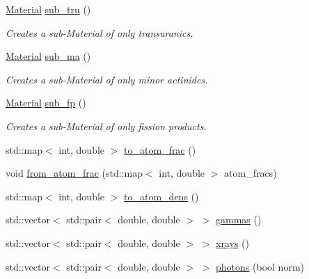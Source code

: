 \begin{DoxyCompactItemize}
\mbox{\label{classpyne_1_1_material_ab0d02f754f1570cca42b33258d1db997}} 
\hyperlink{classpyne_1_1_material}{Material} \hyperlink{classpyne_1_1_material_ab0d02f754f1570cca42b33258d1db997}{sub\+\_\+tru} ()
\begin{DoxyCompactList}\small\item\em Creates a sub-\/\+Material of only transuranics. \end{DoxyCompactList}\item 
\mbox{\label{classpyne_1_1_material_a9d0e3214dda2be1f96a61cf8e379c086}} 
\hyperlink{classpyne_1_1_material}{Material} \hyperlink{classpyne_1_1_material_a9d0e3214dda2be1f96a61cf8e379c086}{sub\+\_\+ma} ()
\begin{DoxyCompactList}\small\item\em Creates a sub-\/\+Material of only minor actinides. \end{DoxyCompactList}\item 
\mbox{\label{classpyne_1_1_material_a514e831b1a9fa7eefad69a89ca81e36d}} 
\hyperlink{classpyne_1_1_material}{Material} \hyperlink{classpyne_1_1_material_a514e831b1a9fa7eefad69a89ca81e36d}{sub\+\_\+fp} ()
\begin{DoxyCompactList}\small\item\em Creates a sub-\/\+Material of only fission products. \end{DoxyCompactList}\item 
std\+::map$<$ int, double $>$ \hyperlink{classpyne_1_1_material_a89a5ef5a4bfca961981a46a4252299fd}{to\+\_\+atom\+\_\+frac} ()
\item 
void \hyperlink{classpyne_1_1_material_a2db9572599c20eb0d17bd0993766f792}{from\+\_\+atom\+\_\+frac} (std\+::map$<$ int, double $>$ atom\+\_\+fracs)
\item 
std\+::map$<$ int, double $>$ \hyperlink{classpyne_1_1_material_adfc05d7c09a0908047a9b733aa7c78b1}{to\+\_\+atom\+\_\+dens} ()
\item 
std\+::vector$<$ std\+::pair$<$ double, double $>$ $>$ \hyperlink{classpyne_1_1_material_a2e2721b8ec8fde2d2e08379b39220d00}{gammas} ()
\item 
std\+::vector$<$ std\+::pair$<$ double, double $>$ $>$ \hyperlink{classpyne_1_1_material_a24fbf883f1623dccc4053106041510d5}{xrays} ()
\item 
std\+::vector$<$ std\+::pair$<$ double, double $>$ $>$ \hyperlink{classpyne_1_1_material_a3630f6f54a7ff6355da0b76b4d0e35a1}{photons} (bool norm)

\end{DoxyCompactItemize}
